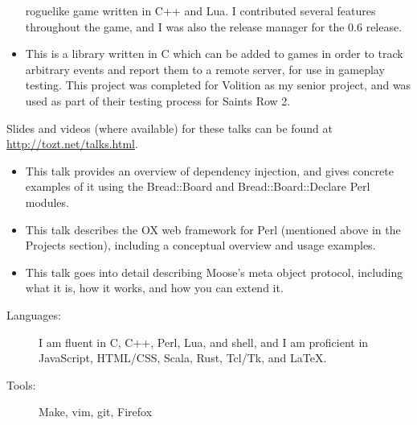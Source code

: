 \documentclass[letterpaper]{article}
\begin{document}
\begin{itemize}
        roguelike game written in C++ and Lua. I contributed several features
        throughout the game, and I was also the release manager for the 0.6
        release.
    \item {} \vspace{6pt} \linebreak
        This is a library written in C which can be added to games in order to
        track arbitrary events and report them to a remote server, for use in
        gameplay testing. This project was completed for Volition as my senior
        project, and was used as part of their testing process for Saints Row
        2.
\end{itemize}

Slides and videos (where available) for these talks can be found at \url{http://tozt.net/talks.html}.

\begin{itemize}
    \item {} \vspace{6pt}\linebreak
        This talk provides an overview of dependency injection, and gives
        concrete examples of it using the Bread::Board and
        Bread::Board::Declare Perl modules.
    \item {} \vspace{6pt}\linebreak
        This talk describes the OX web framework for Perl (mentioned above in
        the Projects section), including a conceptual overview and usage
        examples.
    \item {} \vspace{6pt}\linebreak
        This talk goes into detail describing Moose's meta object protocol,
        including what it is, how it works, and how you can extend it.
\end{itemize}
\begin{description}
    \item[Languages:] I am fluent in C, C++, Perl, Lua, and shell, and I am proficient in JavaScript, HTML/CSS, Scala, Rust, Tcl/Tk, and LaTeX.\vspace{-6pt}
\item[Tools:] Make, vim, git, Firefox
\end{description}
\end{document}
